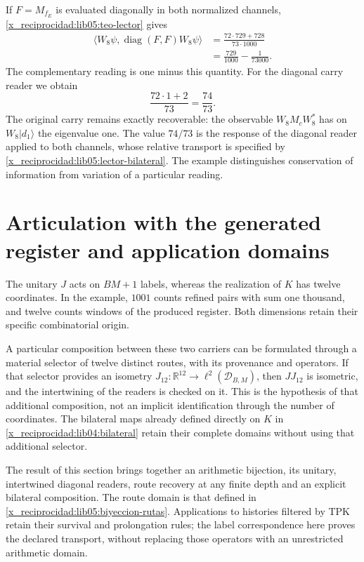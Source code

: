 If \(F=M_{f_E}\) is evaluated diagonally in both normalized
channels, \cref{x_reciprocidad:lib05:teo-lector} gives
\begin{equation}
 \begin{split}
 \langle W_8\psi,\operatorname{diag}(F,F)W_8\psi\rangle
 &=\frac{72\cdot729+728}{73\cdot1000}\\
 &=\frac{729}{1000}-\frac1{73000}.
 \end{split}
 \label{x_reciprocidad:lib05:ejemplo-fraccion}
\end{equation}
The complementary reading is one minus this quantity. For the
diagonal carry reader we obtain
\begin{equation}
 \frac{72\cdot1+2}{73}=\frac{74}{73}.
 \label{x_reciprocidad:lib05:ejemplo-acarreo}
\end{equation}
The original carry remains exactly recoverable: the
observable \(W_8M_cW_8^*\) has on \(W_8|d_1\rangle\)
the eigenvalue one. The value \(74/73\) is the response of the
diagonal reader applied to both channels, whose relative transport
is specified by \eqref{x_reciprocidad:lib05:lector-bilateral}. The example
distinguishes conservation of information from variation of a particular
reading.

\section{Articulation with the generated register and application domains}
\label{x_reciprocidad:lib05:dominios}

The unitary \(J\) acts on \(BM+1\) labels, whereas
the realization of \(K\) has twelve coordinates. In the example,
\(1001\) counts refined pairs with sum one thousand, and twelve counts
windows of the produced register. Both dimensions retain their
specific combinatorial origin.

A particular composition between these two carriers can be formulated
through a material selector of twelve distinct routes, with its
provenance and operators. If that selector provides an
isometry
\(J_{12}:\mathbb R^{12}\to\ell^2(\mathcal D_{B,M})\), then
\(JJ_{12}\) is isometric, and the intertwining of the readers is
checked on it. This is the hypothesis of that additional
composition, not an implicit identification through the number of
coordinates. The bilateral maps already defined directly
on \(K\) in \cref{x_reciprocidad:lib04:bilateral} retain their complete
domains without using that additional selector.

The result of this section brings together an arithmetic bijection, its
unitary, intertwined diagonal readers, route recovery at
any finite depth and an explicit bilateral composition.
The route domain is that defined in
\eqref{x_reciprocidad:lib05:biyeccion-rutas}. Applications to histories
filtered by TPK retain their survival and
prolongation rules; the label correspondence here proves the
declared transport, without replacing those operators with an unrestricted
arithmetic domain.
